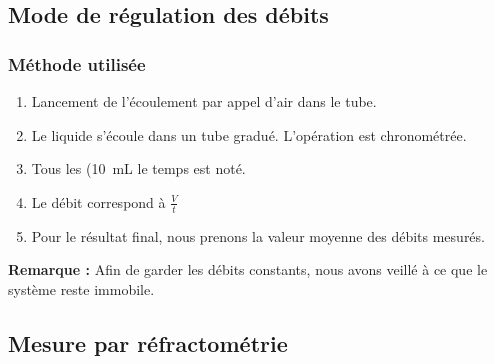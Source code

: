 \documentclass[a4paper,11pt, french]{article}
\begin{document}
	\subsection{Mode de régulation des débits}
		\subsubsection{Méthode utilisée}
			\begin{enumerate}
				\item Lancement de l'écoulement par appel d'air dans le tube.
				\item Le liquide s'écoule dans un tube gradué. L'opération est chronométrée.
				\item Tous les (\SI{10}{\milli\liter} le temps est noté. 
				\item Le débit correspond à $\frac{V}{t}$
				\item Pour le résultat final, nous prenons la valeur moyenne des débits mesurés.
			\end{enumerate}
			\textbf{Remarque :} Afin de garder les débits constants, nous avons veillé à ce que le système reste immobile.
			
	\subsection{Mesure par réfractométrie}
\end{document}
